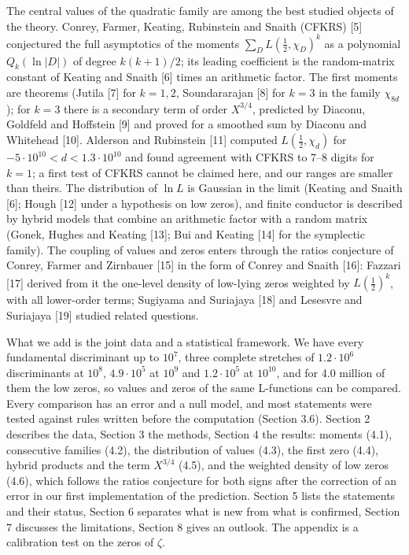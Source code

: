 \documentclass[
  10pt,
]{article}
\begin{document}
The central values of the quadratic family are among the best studied
objects of the theory. Conrey, Farmer, Keating, Rubinstein and Snaith
(CFKRS) {[}5{]} conjectured the full asymptotics of the moments
\(\sum_D L(\tfrac12, \chi_D)^k\) as a polynomial \(Q_k(\ln|D|)\) of
degree \(k(k+1)/2\); its leading coefficient is the random-matrix
constant of Keating and Snaith {[}6{]} times an arithmetic factor. The
first moments are theorems (Jutila {[}7{]} for \(k = 1, 2\),
Soundararajan {[}8{]} for \(k = 3\) in the family \(\chi_{8d}\)); for
\(k = 3\) there is a secondary term of order \(X^{3/4}\), predicted by
Diaconu, Goldfeld and Hoffstein {[}9{]} and proved for a smoothed sum by
Diaconu and Whitehead {[}10{]}. Alderson and Rubinstein {[}11{]}
computed \(L(\tfrac12, \chi_d)\) for
\(-5\cdot10^{10} < d < 1.3\cdot10^{10}\) and found agreement with CFKRS
to 7--8 digits for \(k = 1\); a first test of CFKRS cannot be claimed
here, and our ranges are smaller than theirs. The distribution of
\(\ln L\) is Gaussian in the limit (Keating and Snaith {[}6{]}; Hough
{[}12{]} under a hypothesis on low zeros), and finite conductor is
described by hybrid models that combine an arithmetic factor with a
random matrix (Gonek, Hughes and Keating {[}13{]}; Bui and Keating
{[}14{]} for the symplectic family). The coupling of values and zeros
enters through the ratios conjecture of Conrey, Farmer and Zirnbauer
{[}15{]} in the form of Conrey and Snaith {[}16{]}: Fazzari {[}17{]}
derived from it the one-level density of low-lying zeros weighted by
\(L(\tfrac12)^k\), with all lower-order terms; Sugiyama and Suriajaya
{[}18{]} and Lesesvre and Suriajaya {[}19{]} studied related questions.

What we add is the joint data and a statistical framework. We have every
fundamental discriminant up to \(10^7\), three complete stretches of
\(1.2\cdot10^6\) discriminants at \(10^8\), \(4.9\cdot10^5\) at \(10^9\)
and \(1.2\cdot10^5\) at \(10^{10}\), and for 4.0 million of them the low
zeros, so values and zeros of the same L-functions can be compared.
Every comparison has an error and a null model, and most statements were
tested against rules written before the computation (Section 3.6).
Section 2 describes the data, Section 3 the methods, Section 4 the
results: moments (4.1), consecutive families (4.2), the distribution of
values (4.3), the first zero (4.4), hybrid products and the term
\(X^{3/4}\) (4.5), and the weighted density of low zeros (4.6), which
follows the ratios conjecture for both signs after the correction of an
error in our first implementation of the prediction. Section 5 lists the
statements and their status, Section 6 separates what is new from what
is confirmed, Section 7 discusses the limitations, Section 8 gives an
outlook. The appendix is a calibration test on the zeros of \(\zeta\).
\end{document}
